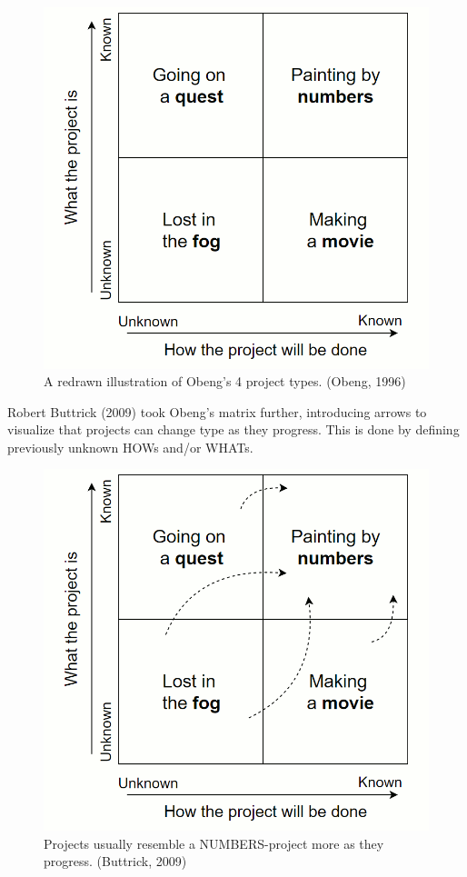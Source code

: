 \begin{figure}[H]
\hspace*{-1cm}
\centering
\includegraphics[scale=0.5]{figure/obeng1.png}
\caption{A redrawn illustration of Obeng's 4 project types. (Obeng, 1996)}
\label{obeng1}
\end{figure}

Robert Buttrick (2009) took Obeng's matrix further, introducing arrows to visualize that projects can change type as they progress. This is done by defining previously unknown HOWs and/or WHATs.
\begin{figure}[H]
\hspace*{-1cm}
\centering
\includegraphics[scale=0.35]{figure/obeng2.png}
\caption{Projects usually resemble a NUMBERS-project more as they progress. (Buttrick, 2009)}
\label{obeng2}
\end{figure}

